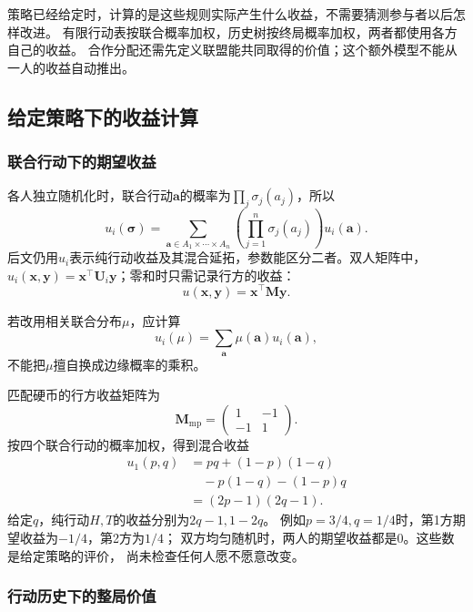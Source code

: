 策略已经给定时，计算的是这些规则实际产生什么收益，不需要猜测参与者以后怎样改进。
有限行动表按联合概率加权，历史树按终局概率加权，两者都使用各方自己的收益。
合作分配还需先定义联盟能共同取得的价值；这个额外模型不能从一人的收益自动推出。

\subsection{给定策略下的收益计算}
\label{sec:game-fixed-policy-payoffs}

\subsubsection{联合行动下的期望收益}
\label{sec:game-joint-expected-payoff}

各人独立随机化时，联合行动\(\bm a\)的概率为\(\prod_j\sigma_j(a_j)\)，所以
\begin{equation}
  u_i(\bm{\sigma})
  =
  \sum_{\bm{a}\in A_1\times\cdots\times A_n}
  \left(
    \prod_{j=1}^{n}\sigma_j(a_j)
  \right)
  u_i(\bm{a}).
  \label{eq:game-mixed-payoff-extension}
\end{equation}
后文仍用\(u_i\)表示纯行动收益及其混合延拓，参数能区分二者。双人矩阵中，
\(u_i(\bm x,\bm y)=\bm x^\top\bm U_i\bm y\)；零和时只需记录行方的收益：
\begin{equation}
  u(\bm{x},\bm{y})
  =
  \bm{x}^{\top}\bm{M}\bm{y}.
  \label{eq:game-matrix-expected-payoff}
\end{equation}

若改用相关联合分布\(\mu\)，应计算
\[
  u_i(\mu)=\sum_{\bm a}\mu(\bm a)u_i(\bm a),
\]
不能把\(\mu\)擅自换成边缘概率的乘积。

匹配硬币的行方收益矩阵为
\[
  \bm M_{\mathrm{mp}}=
  \begin{pmatrix}1&-1\\-1&1\end{pmatrix}.
\]
按四个联合行动的概率加权，得到混合收益
\[
  \begin{aligned}
    u_1(p,q)&=pq+(1-p)(1-q)\\
      &\quad-p(1-q)-(1-p)q\\
      &=(2p-1)(2q-1).
  \end{aligned}
\]
给定\(q\)，纯行动\(H,T\)的收益分别为\(2q-1,1-2q\)。
例如\(p=3/4,q=1/4\)时，第1方期望收益为\(-1/4\)，第2方为\(1/4\)；
双方均匀随机时，两人的期望收益都是\(0\)。这些数是给定策略的评价，
尚未检查任何人愿不愿意改变。

\subsubsection{行动历史下的整局价值}
\label{sec:game-history-value}


